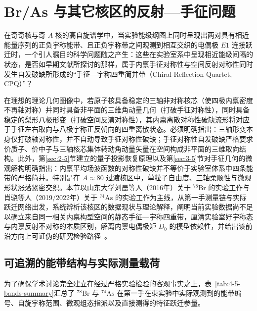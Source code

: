 \section{Br/As 与其它核区的反射---手征问题}\label{sec:4-5}

在奇奇核与奇 $A$ 核的高自旋谱学中，当实验能级纲图上同时呈现出两对具有相近能量序列的正负宇称能带、且正负宇称带之间观测到相互交织的电偶极 $E1$ 连接跃迁时，一个引人瞩目的科学问题随之产生：这些在实验室系中呈现相近能级间隔的状态，是否如早期文献所探讨的那样，属于内禀手征对称性与空间反射对称性同时发生自发破缺所形成的“手征---宇称四重简并带（Chiral-Reflection Quartet, CPQ）”？

在理想的理论几何图像中，若原子核具备稳定的三轴非对称核芯（使四极内禀密度不再轴对称）并同时具备非平面的三维角动量几何（打破手征对称性），同时具备稳定的梨形八极形变（打破空间反演对称性），其内禀离散对称性破缺流形将对应于手征左右取向与八极宇称正反朝向的四重离散状态。必须明确指出：三轴形变本身仅打破轴对称性，并不自动导致手征对称性破缺；手征对称性自发破缺严格要求价质子、价中子与三轴核芯集体转动角动量矢量在空间构成非平面的三维取向结构。此外，第\ref{sec:2-5}节建立的量子投影恢复原理以及第\ref{sec:3-5}节对手征几何的微观解构明确指出：内禀平均场波函数的对称性破缺并不等价于实验室体系中四条能带的严格简并。特别是在 $A \approx 80$ 过渡核区中，单粒子自由度、三轴柔顺性与微观形状涨落紧密交织。本节以山东大学刘晨等人（2016年）关于 $^{78}\mathrm{Br}$ 的实验工作与肖骁等人（2019/2022年）关于 $^{74}\mathrm{As}$ 的实验工作为主线，从第一手测量链与实际跃迁网络出发，系统辨析该核区的数据现状与理论解释，阐明当前实验数据尚不足以确立来自同一相关内禀构型空间的静态手征---宇称四重带，厘清实验室好宇称态与内禀反射不对称的本质区别，解离内禀电偶极矩 $D_0$ 的模型依赖性，并给出该前沿方向上可证伪的研究检验路径~\cite{liu-2016-octupole-correlations-multiple-chiral-doublet-bands-78br,liu-chen-2016-78br-chirality-reflection-symmetry-thesis,xiao-2022-chirality-octupole-correlations-74as,xiao-xiao-2019-high-spin-74as-thesis,butler-1996-octupole-shapes,wang-2019-rat-prm-78br-octupole-correlations}。

\subsection{可追溯的能带结构与实际测量载荷}\label{sec:4-5-1}

为了确保学术讨论完全建立在经过严格实验检验的客观事实之上，表~\ref{tab:4-5-bands-summary}汇总了 $^{78}\mathrm{Br}$ 与 $^{74}\mathrm{As}$ 在第一手在束实验中实际观测到的能带编号、自旋宇称范围、微观组态指派以及直接测得的特征跃迁参量。

